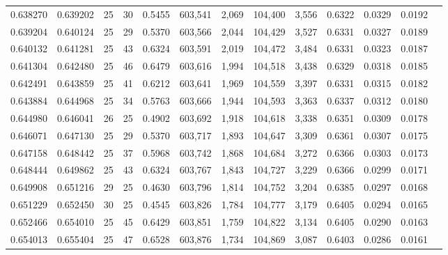 \begin{tabular}{rrrrrrrrrrrrr}
0.638270 & 0.639202 &    25 &  30 &                                     0.5455 & 603,541 &   2,069 & 104,400 &   3,556 & 0.6322 & 0.0329 & 0.0192 \\
0.639204 & 0.640124 &    25 &  29 &                                     0.5370 & 603,566 &   2,044 & 104,429 &   3,527 & 0.6331 & 0.0327 & 0.0189 \\
0.640132 & 0.641281 &    25 &  43 &                                     0.6324 & 603,591 &   2,019 & 104,472 &   3,484 & 0.6331 & 0.0323 & 0.0187 \\
0.641304 & 0.642480 &    25 &  46 &                                     0.6479 & 603,616 &   1,994 & 104,518 &   3,438 & 0.6329 & 0.0318 & 0.0185 \\
0.642491 & 0.643859 &    25 &  41 &                                     0.6212 & 603,641 &   1,969 & 104,559 &   3,397 & 0.6331 & 0.0315 & 0.0182 \\
0.643884 & 0.644968 &    25 &  34 &                                     0.5763 & 603,666 &   1,944 & 104,593 &   3,363 & 0.6337 & 0.0312 & 0.0180 \\
0.644980 & 0.646041 &    26 &  25 &                                     0.4902 & 603,692 &   1,918 & 104,618 &   3,338 & 0.6351 & 0.0309 & 0.0178 \\
0.646071 & 0.647130 &    25 &  29 &                                     0.5370 & 603,717 &   1,893 & 104,647 &   3,309 & 0.6361 & 0.0307 & 0.0175 \\
0.647158 & 0.648442 &    25 &  37 &                                     0.5968 & 603,742 &   1,868 & 104,684 &   3,272 & 0.6366 & 0.0303 & 0.0173 \\
0.648444 & 0.649862 &    25 &  43 &                                     0.6324 & 603,767 &   1,843 & 104,727 &   3,229 & 0.6366 & 0.0299 & 0.0171 \\
0.649908 & 0.651216 &    29 &  25 &                                     0.4630 & 603,796 &   1,814 & 104,752 &   3,204 & 0.6385 & 0.0297 & 0.0168 \\
0.651229 & 0.652450 &    30 &  25 &                                     0.4545 & 603,826 &   1,784 & 104,777 &   3,179 & 0.6405 & 0.0294 & 0.0165 \\
0.652466 & 0.654010 &    25 &  45 &                                     0.6429 & 603,851 &   1,759 & 104,822 &   3,134 & 0.6405 & 0.0290 & 0.0163 \\
0.654013 & 0.655404 &    25 &  47 &                                     0.6528 & 603,876 &   1,734 & 104,869 &   3,087 & 0.6403 & 0.0286 & 0.0161 \\

\end{tabular}
